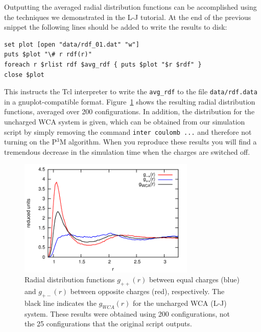 \documentclass[
a4paper,                        %
11pt,                           %
twoside,                        %
footsepline,                    %
headsepline,                    %
headexclude,                    %
footexclude,                    %
pagesize,                       %
]{scrartcl}
\begin{document}
Outputting the averaged radial distribution functions can be accomplished using the techniques we demonstrated in the L-J tutorial. At the end of the previous snippet the following lines should be added to write the results to disk: 

{\small\vspace{0,2cm}
\begin{lstlisting}[numbers=none]
set plot [open "data/rdf_01.dat" "w"]
puts $plot "\# r rdf(r)"
foreach r $rlist rdf $avg_rdf { puts $plot "$r $rdf" }
close $plot
\end{lstlisting}\vspace{0,2cm}
}

\noindent This instructs the Tcl interpreter to write the \verb|avg_rdf| to the file \verb|data/rdf.data| in a gnuplot-compatible format. Figure~\ref{fig:rdf} shows the resulting radial distribution functions, averaged over 200 configurations. In addition, the distribution for the uncharged WCA system is given, which can be obtained from our simulation script by simply removing the command \verb|inter coulomb ...| and therefore not turning on the P$^3$M algorithm. When you reproduce these results you will find a tremendous decrease in the simulation time when the charges are switched off.

\begin{figure}[!ht]
\begin{center}
\includegraphics[width=0.75\textwidth]{figures/rdf}
\caption{\label{fig:rdf} Radial distribution functions $g_{++}(r)$ between equal charges (blue) and $g_{+-}(r)$ between opposite charges (red), respectively. The black line indicates the $g_{WCA}(r)$ for the uncharged WCA (L-J) system. These results were obtained using 200 configurations, not the 25 configurations that the original script outputs.}
\end{center}
\end{figure}
\end{document}
